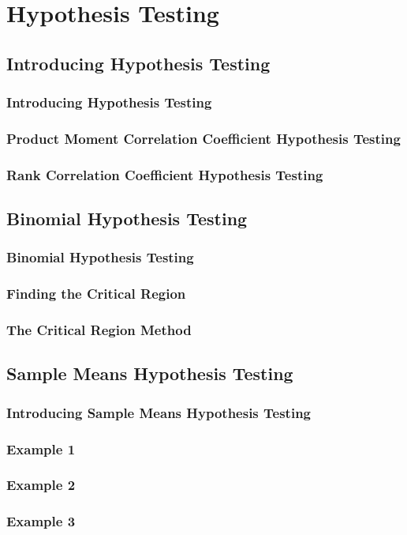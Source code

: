 \documentclass[../alevelmaths.tex]{subfiles}
\begin{document}
\chapter{Hypothesis Testing}
\section{Introducing Hypothesis Testing}
\subsection*{Introducing Hypothesis Testing}
\subsection*{Product Moment Correlation Coefficient Hypothesis Testing}
\subsection*{Rank Correlation Coefficient Hypothesis Testing}
\section{Binomial Hypothesis Testing}
\subsection*{Binomial Hypothesis Testing}
\subsection*{Finding the Critical Region}
\subsection*{The Critical Region Method}
\section{Sample Means Hypothesis Testing}
\subsection*{Introducing Sample Means Hypothesis Testing}
\subsection*{Example 1}
\subsection*{Example 2}
\subsection*{Example 3}
\end{document}
